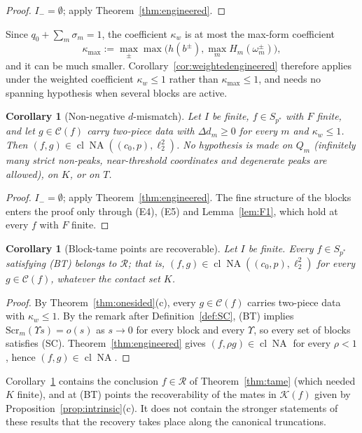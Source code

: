 \documentclass[10pt]{amsart}
\newtheorem{corollary}[theorem]{Corollary}
\theoremstyle{definition}
\theoremstyle{remark}
\newcommand{\NA}{\operatorname{NA}}
\newcommand{\Cset}{\mathcal C}
\newcommand{\cl}{\operatorname{cl}}
\newcommand{\Rec}{\mathcal R}
\begin{document}
\begin{proof}
$I_-=\emptyset$; apply Theorem~\ref{thm:engineered}.
\end{proof}

Since $q_0+\sum_m\sigma_m=1$, the coefficient $\kappa_w$ is at most the
max-form coefficient
\[
 \kappa_{\max}:=\max_\pm\max\big(h(b^\pm),\max_mH_m(\omega^\pm_m)\big),
\]
and it can be much smaller.  Corollary~\ref{cor:weightedengineered}
therefore applies under the weighted coefficient $\kappa_w\le1$ rather than
$\kappa_{\max}\le1$, and needs no spanning hypothesis when several blocks
are active.

\begin{corollary}[Non-negative $d$-mismatch]\label{cor:D1}
Let $I$ be finite, $f\in S_{p^*}$ with $F$ finite, and let $g\in\Cset(f)$
carry two-piece data with $\Delta d_m\ge0$ for every $m$ and $\kappa_w\le1$.
Then $(f,g)\in\cl\NA((c_0,p),\ell_2^2)$.  No hypothesis is made on $Q_m$
\textup{(}infinitely many strict non-peaks, near-threshold coordinates and
degenerate peaks are allowed\textup{)}, on $K$, or on $T$.
\end{corollary}

\begin{proof}
$I_-=\emptyset$; apply Theorem~\ref{thm:engineered}.  The fine structure of
the blocks enters the proof only through (E4), (E5) and
Lemma~\ref{lem:F1}, which hold at every $f$ with $F$ finite.
\end{proof}

\begin{corollary}[Block-tame points are recoverable]\label{cor:BTrecovered}
Let $I$ be finite.  Every $f\in S_{p^*}$ satisfying \textup{(BT)} belongs to
$\Rec$; that is, $(f,g)\in\cl\NA((c_0,p),\ell_2^2)$ for every
$g\in\Cset(f)$, whatever the contact set $K$.
\end{corollary}

\begin{proof}
By Theorem~\ref{thm:onesided}(c), every $g\in\Cset(f)$ carries two-piece
data with $\kappa_w\le1$.  By the remark after Definition~\ref{def:SC},
\textup{(BT)} implies $\mathrm{Scr}_m(\Upsilon s)=o(s)$ as $s\to0$ for every block
and every $\Upsilon$, so every set of blocks satisfies \textup{(SC)}.
Theorem~\ref{thm:engineered} gives $(f,\rho g)\in\cl\NA$ for every
$\rho<1$, hence $(f,g)\in\cl\NA$.
\end{proof}

Corollary~\ref{cor:BTrecovered} contains the conclusion $f\in\Rec$ of
Theorem~\ref{thm:tame} (which needed $K$ finite), and at \textup{(BT)}
points the recoverability of the mates in $\mathcal K(f)$ given by
Proposition~\ref{prop:intrinsic}(c).  It does not contain the stronger
statements of these results that the recovery takes place along the
canonical truncations.
\end{document}
